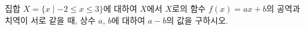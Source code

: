 집합 $X=\{x \mid -2\le x\le 3\}$에 대하여 $X$에서 $X$로의 함수 $f(x)=ax+b$의 공역과 치역이 서로 같을 때, 상수 $a$, $b$에 대하여 $a-b$의 값을 구하시오. 
